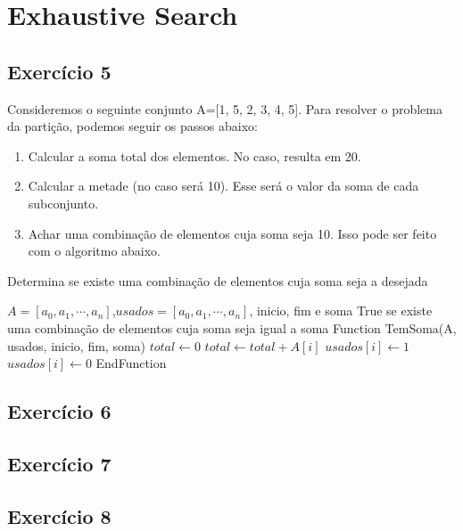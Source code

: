 
\section{Exhaustive Search}\label{sec:exhaustive_force}

\subsection{Exercício 5}\label{sec:exer5}
Consideremos o seguinte conjunto A=[1, 5, 2, 3, 4, 5]. Para resolver o problema da
partição, podemos seguir os passos abaixo:
\begin{enumerate}
  \item Calcular a soma total dos elementos. No caso, resulta em 20.
  \item Calcular a metade (no caso será 10). Esse será o valor da soma de cada
  subconjunto.
  \item Achar uma combinação de elementos cuja soma seja 10. Isso pode ser feito
  com o algoritmo abaixo.
\end{enumerate}

\begin{algorithm}
  \caption{Determina se existe uma combinação de elementos cuja soma seja a desejada}
  \begin{algorithmic}
    \REQUIRE $A=[a_{0}, a_{1}, \cdots, a_{n}]$,$usados=[a_{0}, a_{1}, \cdots, a_{n}]$,
    inicio, fim e soma
    \ENSURE True se existe uma combinação de elementos cuja soma seja igual a soma
    \STATE Function TemSoma(A, usados, inicio, fim, soma)
    \STATE $total \leftarrow 0$
        \STATE $total \leftarrow total + A[i]$
      \ENDIF
    \ENDFOR
      \RETURN \TRUE
    \ENDIF
      \STATE $usados[i] \leftarrow 1$
        \RETURN \TRUE
      \ENDIF
      \STATE $usados[i] \leftarrow 0$
    \ENDFOR
    \RETURN \FALSE
    \STATE EndFunction
  \end{algorithmic}
\end{algorithm}


\subsection{Exercício 6}\label{sec:exer6}

\subsection{Exercício 7}\label{sec:exer7}

\subsection{Exercício 8}\label{sec:exer8}
